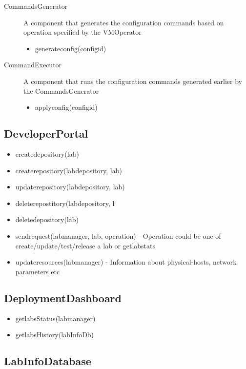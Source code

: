 \documentclass[11pt]{article}
\begin{document}
\begin{description}
\item [CommandsGenerator] A component that generates the
         configuration commands based on operation specified by the
         VMOperator

\begin{itemize}
\item generateconfig(configid)
\end{itemize}

\item [CommandExecutor] A component that runs the configuration
         commands generated earlier by the CommandsGenerator

\begin{itemize}
\item applyconfig(configid)
\end{itemize}

\end{description}
    
\subsection{DeveloperPortal}
\label{sec-4.3}


\begin{itemize}
\item createdepository(lab)
\item createrepository(labdepository, lab)
\item updaterepository(labdepository, lab)
\item deleterepostitory(labdepository, l
\item deletedepository(lab)
\item sendrequest(labmanager, lab, operation) - Operation could be one of  create/update/test/release a lab or getlabstats
\item updateresources(labmanager) - Information about physical-hosts, network parameters etc
\end{itemize}
\subsection{DeploymentDashboard}
\label{sec-4.4}


\begin{itemize}
\item getlabsStatus(labmanager)
\item getlabsHistory(labInfoDb)
\end{itemize}
\subsection{LabInfoDatabase}
\label{sec-4.5}
\end{document}
